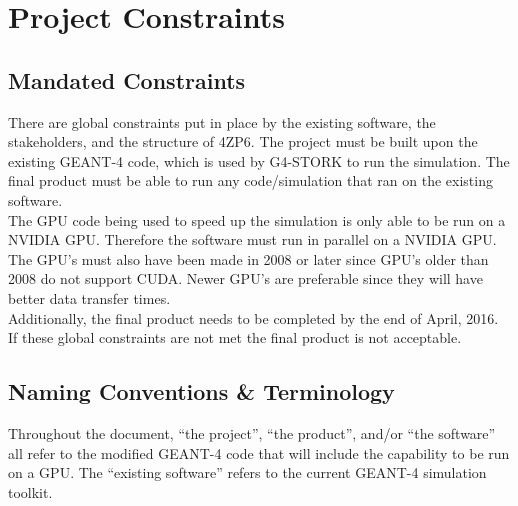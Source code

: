 \documentclass[12pt]{article}
\newcommand{\todo}[1]{\textcolor{red}{[TODO: #1]}} \else
\newcommand{\authornote}[3]{} \newcommand{\todo}[1]{} \fi
\newcommand{\ds}[1]{\authornote{blue}{DS}{#1}} %
\newcommand{\mmp}[1]{\authornote{green}{MP}{#1}}
\begin{document}
\section{Project Constraints}

\subsection{Mandated Constraints} %
There are global constraints put in place by the existing software, the stakeholders, and the structure of 4ZP6. The project must be built upon the existing GEANT-4 code, which is used by G4-STORK to run the simulation. The final product must be able to run any code/simulation that ran on the existing software.\\ 
The GPU code being used to speed up the simulation is only able to be run on a NVIDIA GPU. Therefore the software must run in parallel on a NVIDIA GPU. The GPU's must also have been made in 2008 or later since GPU's older than 2008 do not support CUDA. Newer GPU's are preferable since they will have better data transfer times.\\
Additionally, the final product needs to be completed by the end of April, 2016. If these global constraints are not met the final product is not acceptable.\\



\ds{Why an NVIDIA GPU? Was that constrained by your client?}\mmp{Added an explanation for why we are constrained to using an NVIDIA GPU}
\subsection{Naming Conventions \& Terminology} %
Throughout the document, ``the project'', ``the product'', and/or ``the software'' all refer to the modified GEANT-4 code that will include the capability to be run on a GPU. The ``existing software'' refers to the current GEANT-4 simulation toolkit.\\

\newpage %
\end{document}
